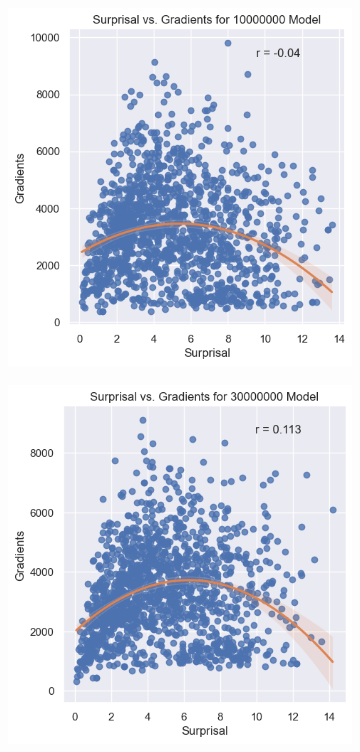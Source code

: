\documentclass{IEEEtran}
\begin{document}
\begin{figure}[h]
    \centering
    \begin{subfigure}{0.4\textwidth}
        \centering
        \includegraphics[width=\textwidth]{surprisal_vs_gradients/10000000.png}
    \end{subfigure}
    \begin{subfigure}{0.4\textwidth}
        \centering
        \includegraphics[width=\textwidth]{surprisal_vs_gradients/30000000.png}
    \end{subfigure}
\end{figure}
\end{document}

